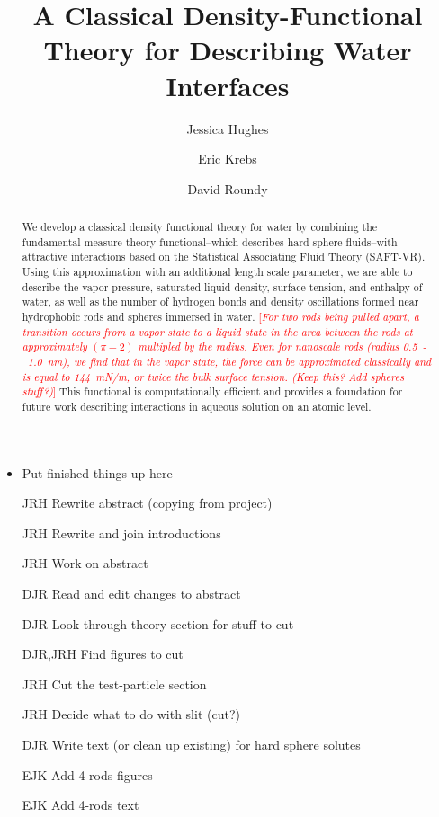 \documentclass[letterpaper,twocolumn,amsmath,amssymb,prb]{revtex4-1}
\newcommand{\needsworknow}[1]{\textcolor{red}{[\emph{#1}]}}
\begin{document}
\title{A Classical Density-Functional Theory for Describing Water Interfaces}

\author{Jessica Hughes}
\author{Eric Krebs}
\author{David Roundy}

\begin{abstract}
{We develop a classical density functional theory for water by combining the
fundamental-measure theory functional--which describes hard sphere fluids--with
attractive interactions based on the Statistical Associating Fluid Theory
(SAFT-VR). Using this approximation with an additional length scale parameter, we are able to describe the vapor pressure, saturated liquid density, surface tension, and enthalpy of water, as well as the number of hydrogen bonds and density oscillations formed near hydrophobic rods and spheres immersed in water. 
\needsworknow{For two rods being pulled apart, a transition occurs 
from a vapor state to a liquid state in the area between
the rods at approximately $(\pi-2)$ multipled by the radius. Even 
for nanoscale rods (radius 0.5~-~1.0~nm), we find that in the
vapor state, the force can be approximated
classically and is equal to 144~mN/m, or twice the bulk surface tension.
(Keep this? Add spheres stuff?)}
This functional is computationally efficient and provides a foundation for 
future work describing interactions in aqueous solution on an
atomic level.}
\end{abstract}
\maketitle

{\begin{itemize}
\color{blue}
\item Put finished things up here
\item[JRH] Rewrite abstract (copying from project)
\color{red}
\item[JRH] Rewrite and join introductions
\item[JRH] Work on abstract
\item[DJR] Read and edit changes to abstract
\item[DJR] Look through theory section for stuff to cut
\item[DJR,JRH] Find figures to cut
\item[JRH] Cut the test-particle section
\item[JRH] Decide what to do with slit (cut?)
\item[DJR] Write text (or clean up existing) for hard sphere solutes
\item[EJK] Add 4-rods figures
\item[EJK] Add 4-rods text
\end{itemize}
}
\end{document}
